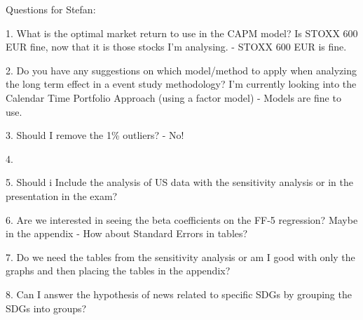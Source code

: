 Questions for Stefan:

1. What is the optimal market return to use in the CAPM model? Is STOXX 600 EUR fine, now that it is those stocks I'm analysing. 
- STOXX 600 EUR is fine. 

2. Do you have any suggestions on which model/method to apply when analyzing the long term effect in a event study methodology? I'm currently looking into the Calendar Time Portfolio Approach (using a factor model) - Models are fine to use. 

3. Should I remove the 1\% outliers?
- No!

4.

5.  Should i Include the analysis of US data with the sensitivity analysis or in the presentation in the exam?

6. Are we interested in seeing the beta coefficients on the FF-5 regression? Maybe in the appendix
- How about Standard Errors in tables? 

7. Do we need the tables from the sensitivity analysis or am I good with only the graphs and then placing the tables in the appendix?

8. Can I answer the hypothesis of news related to specific SDGs by grouping the SDGs into groups?